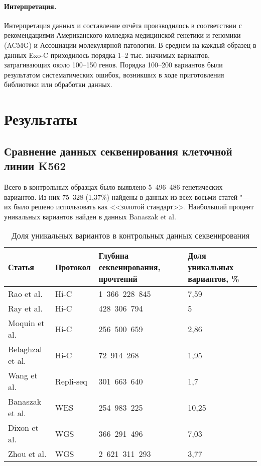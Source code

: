 \documentclass[a4paper,12pt]{article}
\begin{document}
\paragraph{Интерпретация.}
Интерпретация данных и составление отчёта производилось в соответствии с рекомендациями Американского колледжа медицинской генетики и геномики (ACMG) и Ассоциации молекулярной патологии\cite{richards}.
В среднем на каждый образец в данных Exo-C приходилось порядка 1--2 тыс. значимых вариантов, затрагивающих около 100--150 генов.
Порядка 100--200 вариантов были результатом систематических ошибок, возникших в ходе приготовления библиотеки или обработки данных.

\section{Результаты}

\subsection{Сравнение данных секвенирования клеточной линии K562}

Всего в контрольных образцах было выявлено 5~496~486 генетических вариантов.
Из них 75~328 (1,37\%) найдены в данных из всех восьми статей "--- их было решено использовать как <<золотой стандарт>>.
Наибольший процент уникальных вариантов найден в данных Banaszak et al.

\begin{small}
\begin{table}[H]
\caption{Доля уникальных вариантов в контрольных данных секвенирования}
\label{tab:unique-controls}
\begin{tabular}{| l | l | p{} | p{} |}
\hline
Статья & Протокол & Глубина секвенирования, прочтений & Доля уникальных вариантов, \% \\
\hline
Rao et al. & Hi-C & 1~366~228~845 & 7,59 \\
Ray et al. & Hi-C & 428~306~794 & 5 \\
Moquin et al. & Hi-C & 256~500~659 & 2,86 \\
Belaghzal et al. & Hi-C & 72~914~268 & 1,95 \\
Wang et al. & Repli-seq & 301~663~640 & 1,7 \\
Banaszak et al. & WES & 254~983~225 & 10,25 \\
Dixon et al. & WGS & 366~291~496 & 7,03 \\
Zhou et al. & WGS & 2~621~311~293 & 3,77 \\
\hline
\end{tabular}
\end{table}
\end{small}
\end{document}
